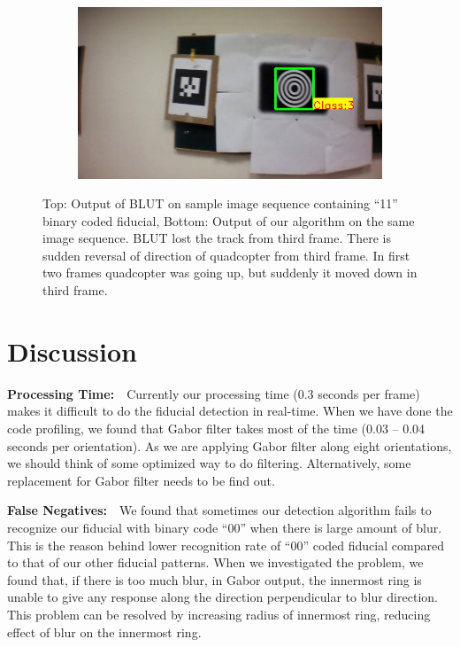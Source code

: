 \documentclass[runningheads]{llncs}
\begin{document}
\begin{figure}
\begin{subfigure}[b]{.19\textwidth}
\end{subfigure}
\begin{subfigure}[b]{.19\textwidth}
\includegraphics[width=\linewidth]{BLUT_input_11/output6.jpg}
\end{subfigure}
\caption{Top: Output of BLUT\cite{Wu:2011} on sample image sequence containing
``11'' binary coded fiducial, Bottom: Output of our algorithm on the same image
sequence. BLUT lost the track from third frame. There is sudden reversal of
direction of quadcopter from third frame. In first two frames quadcopter was
going up, but suddenly it moved down in third frame.}
\label{fig:BLUT_compare_11}
\end{figure}

\section{Discussion}

\noindent\textbf{Processing Time:}~~Currently our processing time (0.3 seconds
per frame) makes it difficult to do the fiducial detection in real-time. When we have
done the code profiling, we found that Gabor filter takes most of the time (0.03
-- 0.04 seconds per orientation). As we are applying Gabor filter along eight
orientations, we should think of some optimized way to do filtering.
Alternatively, some replacement for Gabor filter needs to be find out.

\noindent\textbf{False Negatives:}~~We found that sometimes our detection
algorithm fails to recognize our fiducial with binary code ``00'' when there is
large amount of blur. This is the reason behind lower recognition rate of ``00''
coded fiducial compared to that of our other fiducial patterns. When we
investigated the problem, we found that, if there is too much blur, in Gabor
output, the innermost ring is unable to give any response along the direction
perpendicular to blur direction. This problem can be resolved by increasing
radius of innermost ring, reducing effect of blur on the innermost ring.
\end{document}
